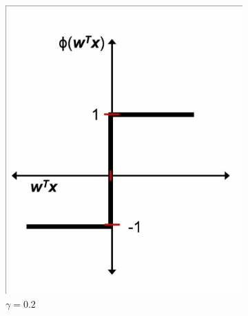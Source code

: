 \documentclass[11pt]{article}
\begin{document}
    \begin{figure}[hbt!]
        \centering
        \begin{subfigure}[t]{.48\textwidth}
            \centering
            \includegraphics[width=\columnwidth,trim=4 4 4 4,clip]{img/perceptron_a.png}
            \caption{$\gamma=0.2$}
            \label{fig:perc_dec_func}
        \end{subfigure}
        ~ %
        \begin{subfigure}[t]{.48\textwidth}
            \centering

\end{subfigure}
\end{figure}
\end{document}
